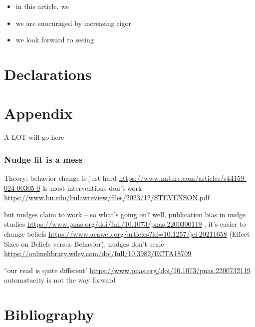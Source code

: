 \documentclass[sn-nature,pdflatex]{sn-jnl}
\providecommand{\tightlist}{%
  \setlength{\itemsep}{0pt}\setlength{\parskip}{0pt}}
\begin{document}
\begin{itemize}
\tightlist
\item
  in this article, we
\item
  we are enocuraged by increasing rigor
\item
  we look forward to seeing
\end{itemize}

\backmatter



\section*{Declarations}\label{declarations}

\section{Appendix}\label{secA1}

A LOT will go here

\subsubsection{Nudge lit is a mess}\label{nudge-lit-is-a-mess}

Theory; behavior change is just hard
\url{https://www.nature.com/articles/s44159-024-00305-0} \& most
interventions don't work
\url{https://www.bu.edu/bulawreview/files/2023/12/STEVENSON.pdf}

but nudges claim to work -- so what's going on? well, publication bias
in nudge studies
\url{https://www.pnas.org/doi/full/10.1073/pnas.2200300119} , it's
easier to change beliefs
\url{https://www.aeaweb.org/articles?id=10.1257/jel.20211658} (Effect
Sizes on Beliefs versus Behavior), nudges don't scale
\url{https://onlinelibrary.wiley.com/doi/full/10.3982/ECTA18709}

``our read is quite different'
\url{https://www.pnas.org/doi/10.1073/pnas.2200732119} automatacity is
not the way forward

\section{Bibliography}\label{bibliography}

\renewcommand\refname{References}

\end{document}
